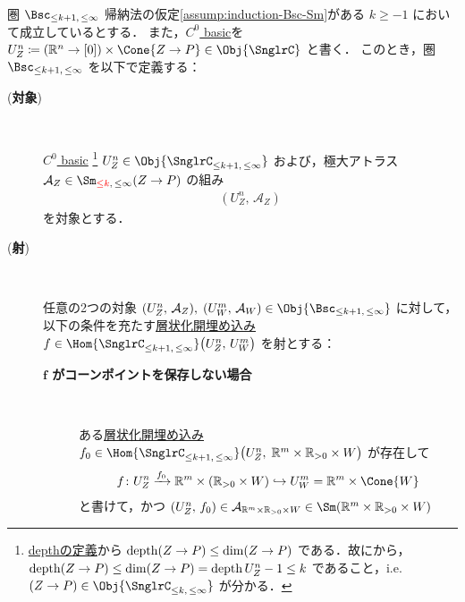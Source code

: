 \documentclass[TQFT_main]{subfiles}
\begin{document}
\begin{mydef}[label=def:Bsc-induction,breakable]{圏 $\Bsc_{\le k+1,\, \le \infty}$}
    帰納法の仮定\ref{assump:induction-Bsc-Sm}がある $k \ge -1$ において成立しているとする．
    また，\hyperref[def:C0-basic]{$C^0$ basic}を $U^n_Z \coloneqq (\mathbb{R}^n \to [0]) \times \Cone{Z \to P} \in \Obj{\SnglrC}$ と書く．
    このとき，圏 $\Bsc_{\le k+1,\, \le \infty}$ を以下で定義する：
    \begin{description}
        \item[(\textbf{対象})]　
        
        \hyperref[def:C0-basic]{$C^0$ basic}
        \footnote{\hyperref[def:dim-depth]{depthの定義}から $\operatorname{depth} (Z \to P) \le \dim (Z \to P)$ である．故にから，$\operatorname{depth} (Z \to P) \le \dim (Z \to P) = \operatorname{depth} U^n_Z - 1 \le k$ であること，i.e. $(Z \to P) \in \Obj{\SnglrC_{\le k,\, \le \infty}}$ が分かる．} $U^n_Z \in \Obj{\SnglrC_{\le k+1,\, \le \infty}}$ および，極大アトラス $\mathcal{A}_Z \in \Sm_{\textcolor{red}{\le k},\, \le \infty} (Z \to P)$ の組み
        \begin{align}
            (U^n_Z,\, \mathcal{A}_Z)
        \end{align}
        を対象とする．

        \item[(\textbf{射})]　
        
        任意の2つの対象 $(U^n_Z,\, \mathcal{A}_Z),\; (U^m_W,\, \mathcal{A}_W) \in \Obj{\Bsc_{\le k+1,\, \le \infty}}$ に対して，以下の条件を充たす\hyperref[def:strat-emb]{層状化開埋め込み} $f \in \Hom{\SnglrC_{\le k+1,\, \le \infty}} \bigl(U^n_Z,\, U^m_W \bigr)$ を射とする：
        \begin{description}
            \item[\textbf{$\bm{f}$ がコーンポイントを保存しない場合}]　  
            
            ある\hyperref[def:strat-emb]{層状化開埋め込み} $f_0 \in \Hom{\SnglrC_{\le k+1,\, \le \infty}} \bigl(U^n_Z,\; \mathbb{R}^m \times \mathbb{R}_{> 0} \times W\bigr)$ が存在して
            \begin{align}
                f \colon U^n_Z \xrightarrow{f_0} \mathbb{R}^m \times (\mathbb{R}_{> 0} \times W) \hookrightarrow U^m_W = \mathbb{R}^m \times \Cone{W}
            \end{align}
            と書けて，かつ $(U^n_Z,\, f_0) \in \mathcal{A}_{\mathbb{R}^m \times \mathbb{R}_{> 0} \times W} \in \Sm(\mathbb{R}^m \times \mathbb{R}_{> 0} \times W)$
            

\end{description}
\end{description}
\end{mydef}
\end{document}
